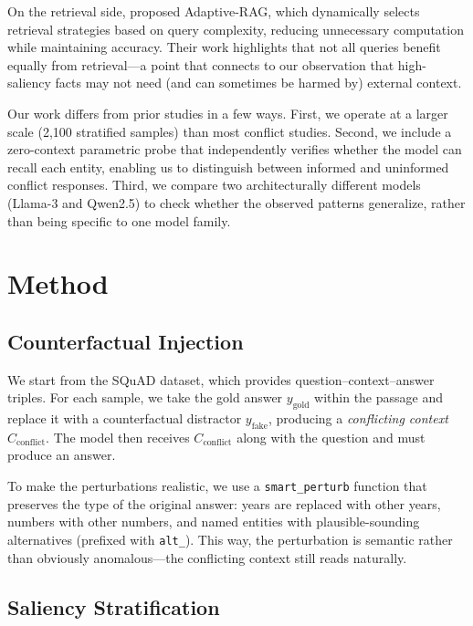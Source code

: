\documentclass[11pt, letterpaper]{article}
\begin{document}
On the retrieval side, \citet{jeong2024adaptiverag} proposed Adaptive-RAG, which dynamically selects retrieval strategies based on query complexity, reducing unnecessary computation while maintaining accuracy. Their work highlights that not all queries benefit equally from retrieval---a point that connects to our observation that high-saliency facts may not need (and can sometimes be harmed by) external context.

Our work differs from prior studies in a few ways. First, we operate at a larger scale (2,100 stratified samples) than most conflict studies. Second, we include a zero-context parametric probe that independently verifies whether the model can recall each entity, enabling us to distinguish between informed and uninformed conflict responses. Third, we compare two architecturally different models (Llama-3 and Qwen2.5) to check whether the observed patterns generalize, rather than being specific to one model family.

\section*{Method}

\subsection*{Counterfactual Injection}

We start from the SQuAD dataset, which provides question--context--answer triples. For each sample, we take the gold answer $y_\text{gold}$ within the passage and replace it with a counterfactual distractor $y_\text{fake}$, producing a \textit{conflicting context} $C_\text{conflict}$. The model then receives $C_\text{conflict}$ along with the question and must produce an answer.

To make the perturbations realistic, we use a \texttt{smart\_perturb} function that preserves the type of the original answer: years are replaced with other years, numbers with other numbers, and named entities with plausible-sounding alternatives (prefixed with \texttt{alt\_}). This way, the perturbation is semantic rather than obviously anomalous---the conflicting context still reads naturally.

\subsection*{Saliency Stratification}
\end{document}

